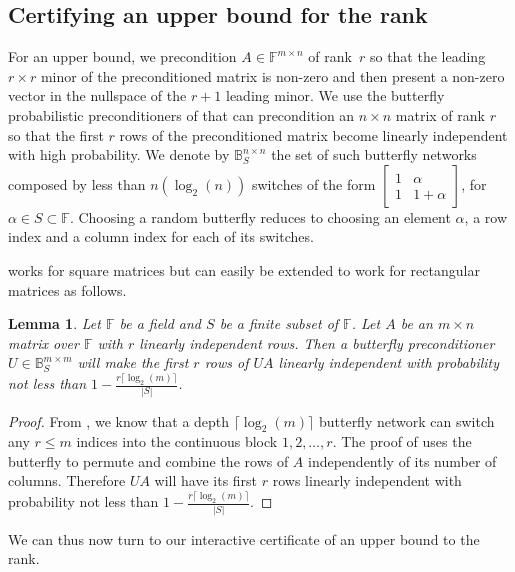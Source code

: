 \documentclass{article}
\newtheorem{lemma}{Lemma}
\newcommand{\F}{\ensuremath{\mathbb F}}
\newcommand{\B}{\ensuremath{\mathbb B}}
\begin{document}
\subsection{Certifying an upper bound for the rank}
For an upper bound, we precondition $A\in\F^{m\times n}$ of rank~$r$ so that the
leading $r\times r$ minor of the preconditioned matrix is non-zero and then
present a non-zero vector in the nullspace of the $r+1$ leading minor. 
We use the butterfly probabilistic preconditioners of 
\cite[Theorem 6.3]{Chen:2002:EMP} that can precondition an $n\times n$ matrix of
rank $r$ so that the first $r$ rows of the preconditioned matrix become linearly
independent with high probability. 
We denote by $\B_S^{n\times n}$ the set of such butterfly networks composed by
less than $n(\log_2(n))$ switches of the form
$\left[\begin{array}{cc}1&\alpha\\1&1+\alpha\end{array}\right]$, for
$\alpha\in S\subset\F$. Choosing a random butterfly reduces to choosing an element
$\alpha$, a row index and a column index for each of its switches.

 
\cite[Theorem 6.3]{Chen:2002:EMP} works for square matrices but can easily be
extended to work for rectangular matrices as follows.
\begin{lemma}\label{lem:genbut}
  Let $\F$ be a field and $S$ be a finite subset of $\F$.
  Let $A$ be an $m\times n$ matrix over $\F$
  with $r$ linearly independent rows. Then a butterfly preconditioner
  $U\in\B_S^{m\times m}$ will make the first $r$ rows of $UA$ linearly independent
  with probability not less than $1-\frac{r\lceil \log_2(m)\rceil}{|S|}$.
\end{lemma}
\begin{proof}
From  
\cite[Theorem 6.2]{Chen:2002:EMP}, 
we know that a depth $\lceil\log_2(m)\rceil$ butterfly network can switch any
$r\leq m$ indices into the continuous block $1,2,\ldots,r$. 
The proof of \cite[Theorem 6.3]{Chen:2002:EMP} uses the butterfly to
permute and combine the rows of $A$ independently of its number of columns.
Therefore $UA$ will have its first $r$ rows linearly independent with probability not less than $1-\frac{r\lceil \log_2(m)\rceil}{|S|}$.
\end{proof}
We can thus now turn to our interactive certificate of an upper bound to the rank.
\end{document}
